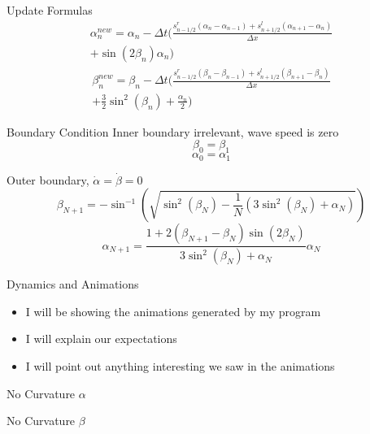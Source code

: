 \documentclass[12pt]{beamer}
\begin{document}
\begin{frame}{Update Formulas}
    \begin{multline*}
        \alpha_n^{new} = \alpha_n - \Delta t \Biggl( \frac{s_{n-1/2}^r (\alpha_n -
        \alpha_{n-1}) + s_{n+1/2}^l (\alpha_{n+1} - \alpha_n)}{\Delta x} \\
        + \sin(2\beta_n)\alpha_n \Biggr)
    \end{multline*}
    \begin{multline*}
        \beta_n^{new} = \beta_n - \Delta t \Biggl( \frac{s_{n-1/2}^r (\beta_n -
        \beta_{n-1}) + s_{n+1/2}^l (\beta_{n+1} - \beta_n)}{\Delta x} \\
        + \frac{3}{2}\sin^2(\beta_n) + \frac{\alpha_n}{2} \Biggr)
    \end{multline*}
\end{frame}

\begin{frame}{Boundary Condition}
    Inner boundary irrelevant, wave speed is zero
    \[ \beta_0 = \beta_1 \]
    \[ \alpha_0 = \alpha_1 \]

    Outer boundary, $\dot{\alpha} = \dot{\beta} = 0$
    \[ \beta_{N+1} = -\sin^{-1}\left( \sqrt{\sin^2(\beta_N) - \frac{1}{N}
    (3\sin^2(\beta_N) + \alpha_N)} \right) \]
    \[ \alpha_{N+1} = \frac{1 + 2 (\beta_{N+1} - \beta_N)
    \sin(2\beta_N)}{3\sin^2(\beta_N) + \alpha_N} \alpha_N \]
\end{frame}

\begin{frame}{Dynamics and Animations}
    \begin{itemize}
        \item I will be showing the animations generated by my program
        \item I will explain our expectations
        \item I will point out anything interesting we saw in the animations
    \end{itemize}
\end{frame}

\begin{frame}[shrink]{No Curvature $\alpha$}
    \centering
\end{frame}
\begin{frame}[shrink]{No Curvature $\beta$}
    \centering
\end{frame}
\end{document}

